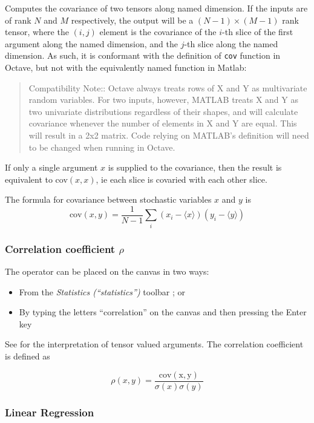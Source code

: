 Computes the covariance of two tensors along named dimension. If the
inputs are of rank $N$ and $M$ respectively, the output will be
a $(N-1)\times(M-1)$ rank tensor, where the $(i,j)$ element is the
covariance of the $i$-th slice of the first argument along the named
dimension, and the $j$-th slice along the named dimension. As such,
it is conformant with the definition of \texttt{cov} function in Octave,
but not with the equivalently named function in Matlab: 
\begin{quote}
Compatibility Note:: Octave always treats rows of X and Y as multivariate
random variables. For two inputs, however, MATLAB treats X and Y as
two univariate distributions regardless of their shapes, and will
calculate covariance whenever the number of elements in X and Y are
equal. This will result in a 2x2 matrix. Code relying on MATLAB's
definition will need to be changed when running in Octave. 
\end{quote}
If only a single argument $x$ is supplied to the covariance, then
the result is equivalent to cov$(x,x)$, ie each slice is covaried
with each other slice.

The formula for covariance between stochastic variables $x$ and $y$
is 
\[
\mathrm{cov}(x,y)=\frac{1}{N-1}\sum_{i}(x_{i}-\langle x\rangle)(y_{i}-\langle y\rangle)
\]

\subsubsection{Correlation coefficient $\rho$}\label{Operation:correlation}

\label{Operation:rho}


The operator can be placed on the canvas in two ways:
\begin{itemize}
\item From the \emph{Statistics (``statistics'')} toolbar ;
or 
\item By typing the letters ``correlation'' on the canvas and then pressing
the Enter key
\end{itemize}
See  for the interpretation of tensor valued
arguments. The correlation coefficient is defined as

\[
\rho(x,y)=\frac{\mathrm{cov(x,y)}}{\sigma(x)\sigma(y)}
\]

\subsubsection{Linear Regression}\label{Operation:linearRegression}


